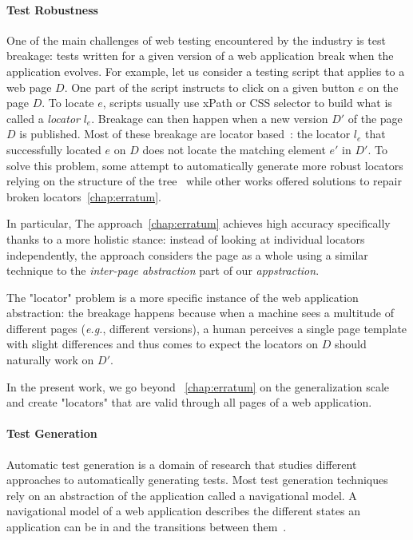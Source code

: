 \paragraph{Test Robustness}
One of the main challenges of web testing encountered by the industry is test breakage: tests written for a given version of a web application break when the application evolves.
For example, let us consider a testing script that applies to a web page $D$.
One part of the script instructs to click on a given button $e$ on the page $D$.
To locate $e$, scripts usually use xPath or CSS selector to build what is called a \emph{locator} $l_e$. 
Breakage can then happen when a new version $D'$ of the page $D$ is published.
Most of these breakage are locator based~\cite{Hammoudi2016WhyBreak}: the locator $l_e$ that successfully located $e$ on $D$ does not locate the matching element $e'$ in $D'$. 
To solve this problem, some attempt to automatically generate more robust locators relying on the structure of the tree~\cite{Leotta2016spanLocators, Leotta2021Sidereal:Testing, Yandrapally2014RobustClues, Bajaj2016SynthesizingLocators} while other works offered solutions to repair broken locators~\ref{chap:erratum}.

In particular, The \erratum{} approach~\ref{chap:erratum} achieves high accuracy specifically thanks to a more holistic stance: instead of looking at individual locators independently, the approach considers the page as a whole using a similar technique to the \emph{inter-page abstraction} part of our \emph{appstraction}.

The "locator" problem is a more specific instance of the web application abstraction: the breakage happens because when a machine sees a multitude of different pages (\emph{e.g.}, different versions), a human perceives a single page template with slight differences and thus comes to expect the locators on $D$ should naturally work on $D'$. 

In the present work, we go beyond \erratum{}~\ref{chap:erratum} on the generalization scale and create "locators" that are valid through all pages of a web application.

\paragraph{Test Generation}
Automatic test generation is a domain of research that studies different approaches to automatically generating tests. Most test generation techniques rely on an abstraction of the application called a navigational model. A navigational model of a web application describes the different states an application can be in and the transitions between them~\cite{mesbah2009invariant}.

